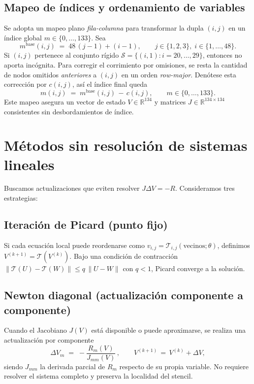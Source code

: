 \documentclass[12pt,letterpaper]{article}
\theoremstyle{definition}
\theoremstyle{remark}
\newcommand{\R}{\mathbb{R}}
\newcommand{\norm}[1]{\lVert #1\rVert}
\begin{document}
\subsection{Mapeo de índices y ordenamiento de variables}
Se adopta un mapeo plano \emph{fila-columna} para transformar la dupla $(i,j)$ en un índice global $m\in\{0,\dots,133\}$. Sea
\begin{equation}\label{eq:index-base}
  m^{\text{base}}(i,j) \;=\; 48\,(j-1) + (i-1), \qquad j\in\{1,2,3\},\; i\in\{1,\dots,48\}.
\end{equation}
Si $(i,j)$ pertenece al conjunto rígido $\mathcal{S}=\{(i,1): i=20,\dots,29\}$, entonces no aporta incógnita. Para corregir el corrimiento por omisiones, se resta la cantidad de nodos omitidos \emph{anteriores} a $(i,j)$ en un orden \emph{row-major}. Denótese esta corrección por $c(i,j)$, así el índice final queda
\begin{equation}
  m(i,j)\;=\; m^{\text{base}}(i,j)\,-\,c(i,j),\qquad m\in\{0,\dots,133\}.
\end{equation}
Este mapeo asegura un vector de estado $V\in\R^{134}$ y matrices $J\in\R^{134\times134}$ consistentes sin desbordamientos de índice.

\section{Métodos sin resolución de sistemas lineales}
Buscamos actualizaciones que eviten resolver $J\Delta V=-R$. Consideramos tres estrategias:

\subsection{Iteración de Picard (punto fijo)}
Si cada ecuación local puede reordenarse como $v_{i,j}=\mathcal{T}_{i,j}(\text{vecinos};\theta)$, definimos $V^{(k+1)}=\mathcal{T}(V^{(k)})$. Bajo una condición de contracción $\norm{\mathcal{T}(U)-\mathcal{T}(W)}\le q\,\norm{U-W}$ con $q<1$, Picard converge a la solución.

\subsection{Newton diagonal (actualización componente a componente)}
Cuando el Jacobiano $J(V)$ está disponible o puede aproximarse, se realiza una actualización por componente
\[
  \Delta V_m\;=\; -\frac{R_m(V)}{J_{mm}(V)}\,,\qquad V^{(k+1)}\,=\,V^{(k)}+\Delta V,
\]
siendo $J_{mm}$ la derivada parcial de $R_m$ respecto de su propia variable. No requiere resolver el sistema completo y preserva la localidad del stencil.
\end{document}
